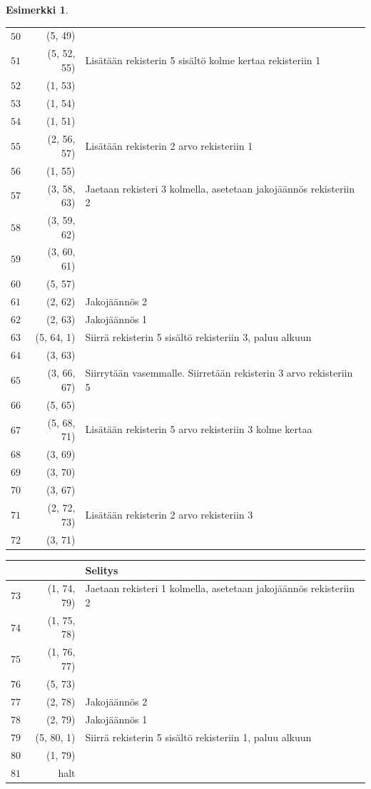 \documentclass[a4paper, 12pt]{article}
\theoremstyle{definition}
\newtheorem{example}[mydef]{Esimerkki}
\theoremstyle{plain}
\begin{document}
\begin{example}
\begin{center}
\begin{tabular}[t]{r|r|l}
$\hat{50}$ & (5, 49) &  \\
$\hat{51}$ & (5, 52, 55) & Lisätään rekisterin 5 sisältö kolme kertaa rekisteriin 1 \\
$\hat{52}$ & (1, 53) &  \\
$\hat{53}$ & (1, 54) &  \\
$\hat{54}$ & (1, 51) &  \\
$\hat{55}$ & (2, 56, 57) & Lisätään rekisterin 2 arvo rekisteriin 1 \\
$\hat{56}$ & (1, 55) &  \\
$\hat{57}$ & (3, 58, 63) & Jaetaan rekisteri 3 kolmella, asetetaan jakojäännös rekisteriin 2 \\
$\hat{58}$ & (3, 59, 62) &  \\
$\hat{59}$ & (3, 60, 61) &  \\
$\hat{60}$ & (5, 57) &  \\
$\hat{61}$ & (2, 62) & Jakojäännös 2 \\
$\hat{62}$ & (2, 63) & Jakojäännös 1 \\
$\hat{63}$ & (5, 64, 1) & Siirrä rekisterin 5 sisältö rekisteriin 3, paluu alkuun \\
$\hat{64}$ & (3, 63) &  \\
$\hat{65}$ & (3, 66, 67) & Siirrytään vasemmalle. Siirretään rekisterin 3 arvo rekisteriin 5 \\
$\hat{66}$ & (5, 65) &  \\
$\hat{67}$ & (5, 68, 71) & Lisätään rekisterin 5 arvo rekisteriin 3 kolme kertaa \\
$\hat{68}$ & (3, 69) &  \\
$\hat{69}$ & (3, 70) &  \\
$\hat{70}$ & (3, 67) &  \\
$\hat{71}$ & (2, 72, 73) & Lisätään rekisterin 2 arvo rekisteriin 3 \\
$\hat{72}$ & (3, 71) &  \\
\end{tabular}
\end{center}
\begin{center}
\begin{tabular}[t]{r|r|l}
& & Selitys\\
\hline
$\hat{73}$ & (1, 74, 79) & Jaetaan rekisteri 1 kolmella, asetetaan jakojäännös rekisteriin 2 \\
$\hat{74}$ & (1, 75, 78) &  \\
$\hat{75}$ & (1, 76, 77) &  \\
$\hat{76}$ & (5, 73) &  \\
$\hat{77}$ & (2, 78) & Jakojäännös 2 \\
$\hat{78}$ & (2, 79) & Jakojäännös 1 \\
$\hat{79}$ & (5, 80, 1) & Siirrä rekisterin 5 sisältö rekisteriin 1, paluu alkuun \\
$\hat{80}$ & (1, 79) &  \\
$\hat{81}$ & halt & \\
\end{tabular}
\end{center}

\end{example}
\end{document}

